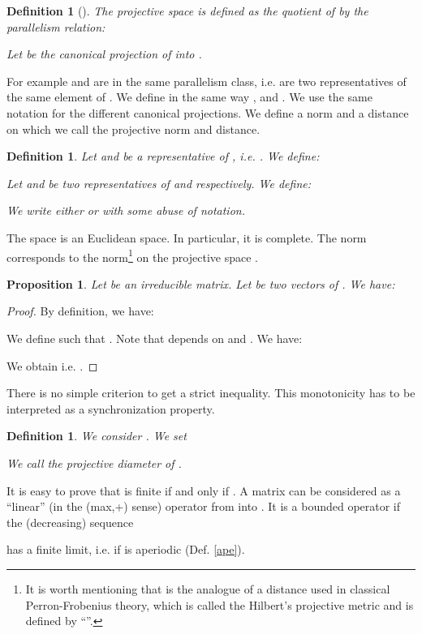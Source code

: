 \documentclass[11pt,titlepage]{article}
\newtheorem{prop}[theo]{Proposition }
\newtheorem{defi}[theo]{Definition }
\begin{document}
\begin{defi}[]
The projective space  is defined as the quotient of 
by the parallelism relation: 

Let  be the canonical projection of  into .
\label{de:pi}
\end{defi}
For example  and  are in the same parallelism
class, i.e. are two 
representatives of the same element of . 
We define in the same way ,  and
. 
We use the same notation  for the different canonical projections.
We define a norm and a distance on  which we call 
the projective norm and 
distance. 
\begin{defi}
Let  and  be a representative of , i.e. .
We define:

Let  and  be two representatives of  and 
respectively.
We define:

We write either
 or  with some abuse of notation.
\label{dist}
\end{defi}

The space  is an Euclidean space. 
In particular, it is complete.
The norm  corresponds to
the  norm\footnote{It is worth
mentioning that  is the  analogue of a 
distance used in classical Perron-Frobenius 
theory, which is called the Hilbert's projective metric and is defined by ``''.} on the projective
space .  

\begin{prop}
Let  be an irreducible matrix. Let  be two
vectors of . We have: 

\label{decd}
\end{prop}

\begin {proof}
By definition, we have:

We define  such that . Note that  depends on  and . We
have: 

We obtain
 i.e. . 
\end {proof} 


There is no simple criterion to get a strict inequality. This monotonicity 
has to be 
interpreted as a synchronization property.

\begin{defi}
We consider . We set 

We call  the projective diameter of .
\label{D}
\end{defi}
It is easy to prove that  is finite if and only if
. 
A matrix  can be considered as a ``linear'' (in the (max,+) sense)
operator
from
 into . It is a bounded operator if the (decreasing) sequence
 
has a finite limit, i.e. if  is aperiodic (Def. \ref{ape}).
\end{document}
